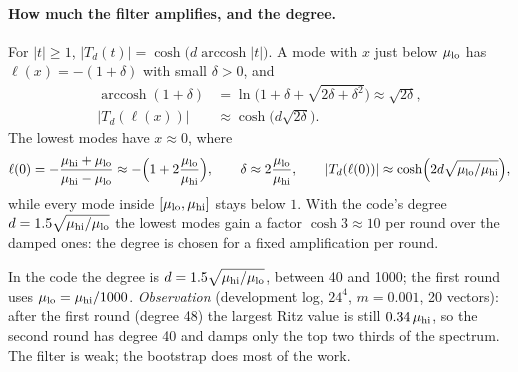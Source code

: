 \documentclass[11pt,a4paper]{article}
\numberwithin{equation}{section}
\begin{document}
\paragraph{How much the filter amplifies, and the degree.} For $|t|\ge1$,
$|T_d(t)|=\cosh\!\big(d\operatorname{arccosh}|t|\big)$. A mode with $x$ just below $\mu_{\rm lo}$
has $\ell(x)=-(1+\delta)$ with small $\delta>0$, and
\begin{align}
\operatorname{arccosh}(1+\delta)&=\ln\!\Big(1+\delta+\sqrt{2\delta+\delta^2}\Big)\approx\sqrt{2\delta},\nonumber\\
|T_d(\ell(x))|&\approx\cosh\!\big(d\sqrt{2\delta}\big).
\end{align}
The lowest modes have $x\approx0$, where
\begin{equation}
\ell(0)=-\frac{\mu_{\rm hi}+\mu_{\rm lo}}{\mu_{\rm hi}-\mu_{\rm lo}}
\approx-\Big(1+2\frac{\mu_{\rm lo}}{\mu_{\rm hi}}\Big),\qquad
\delta\approx2\frac{\mu_{\rm lo}}{\mu_{\rm hi}},\qquad
|T_d(\ell(0))|\approx\cosh\!\Big(2d\sqrt{\mu_{\rm lo}/\mu_{\rm hi}}\Big),
\end{equation}
while every mode inside $[\mu_{\rm lo},\mu_{\rm hi}]$ stays below $1$. With the code's
degree $d=1.5\sqrt{\mu_{\rm hi}/\mu_{\rm lo}}$ the lowest modes gain a factor
$\cosh3\approx10$ per round over the damped ones: the degree is chosen for a fixed amplification
per round.

In the code the degree is $d=1.5\sqrt{\mu_{\rm hi}/\mu_{\rm lo}}$, between 40 and 1000; the first round
uses $\mu_{\rm lo}=\mu_{\rm hi}/1000$. \emph{Observation} (development log, $24^4$, $m=0.001$, 20 vectors): after
the first round (degree 48) the largest Ritz value is still $0.34\,\mu_{\rm hi}$, so the
second round has degree 40 and damps only the top two thirds of the spectrum. The filter is weak;
the bootstrap does most of the work.
\end{document}

